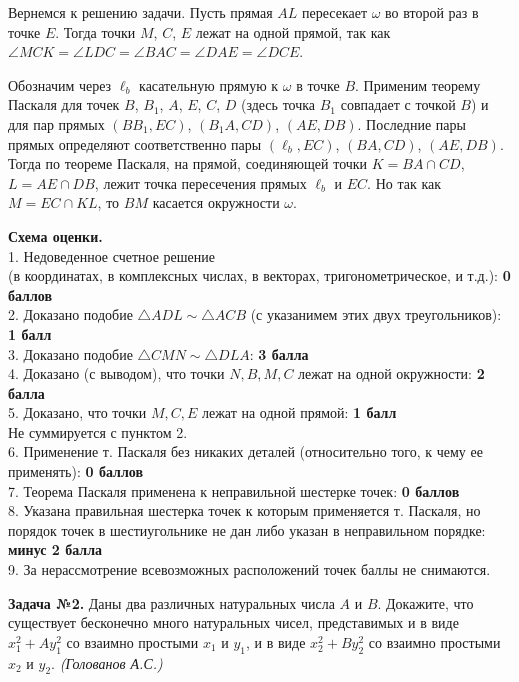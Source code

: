 \documentclass[12pt]{article}
\def \Problem#1{\par \bigskip \textbf{Задача №{#1}. }}
\def \marking{\par \bigskip \textbf{Схема оценки. }}
\begin{document}
Вернемся к решению задачи. Пусть прямая $AL$ пересекает $\omega$ во второй раз в точке $E$. Тогда точки $M$, $C$, $E$ лежат на одной прямой, так как $\angle MCK=\angle LDC=\angle BAC=\angle DAE=\angle DCE$.

Обозначим через $\ell_b$ касательную  прямую к $\omega$ в точке $B$. Применим теорему Паскаля для точек $B$, $B_1$, $A$, $E$, $C$, $D$ (здесь точка $B_1$ совпадает с точкой $B$) и для пар прямых $(BB_1,EC)$, $(B_1A,CD)$, $(AE,DB)$. Последние пары прямых определяют соответственно пары $(\ell_b, EC)$, $(BA,CD)$, $(AE, DB)$. Тогда по теореме Паскаля, на прямой, соединяющей точки $K=BA\cap CD$, $L=AE\cap DB$, лежит точка пересечения прямых $\ell_b$ и $EC$. Но так как $M=EC \cap KL$, то $BM$ касается окружности $\omega$. 

\marking
\\ 1. Недоведенное счетное решение \\(в координатах, в комплексных числах, в векторах, тригонометрическое, и т.д.): \dotfill \textbf{0 баллов}
\\ 2. Доказано подобие $\triangle ADL \sim \triangle ACB$ (с указанимем этих двух треугольников): \dotfill \textbf{1 балл} 
\\ 3. Доказано подобие $\triangle CMN \sim \triangle DLA$: \dotfill \textbf{3 балла}
\\ 4. Доказано (с выводом), что точки $N,B,M,C$ лежат на одной окружности: \dotfill \textbf{2 балла}
\\ 5. Доказано, что точки $M,C,E$ лежат на одной прямой: \dotfill \textbf{1 балл}
\\ Не суммируется с пунктом 2.
\\ 6. Применение т. Паскаля без никаких деталей (относительно того, к чему ее применять): \dotfill \textbf{0 баллов}
\\ 7. Теорема Паскаля применена к неправильной шестерке точек: \dotfill \textbf{0 баллов}
\\ 8. Указана правильная шестерка точек к которым применяется т. Паскаля, но порядок точек в шестиугольнике не дан либо указан в неправильном порядке: \dotfill \textbf{минус 2 балла}
\\ 9. За нерассмотрение всевозможных расположений точек баллы не снимаются.


\Problem{2} Даны два различных натуральных числа $A$ и $B$. Докажите, что существует бесконечно много натуральных чисел, представимых и в виде $x_1^2+Ay_1^2$ со взаимно простыми $x_1$ и $y_1$, и в виде $x_2^2+ By_2^2$ со взаимно простыми $x_2$ и $y_2$.
\textit{(Голованов А.С.)}
\end{document}
